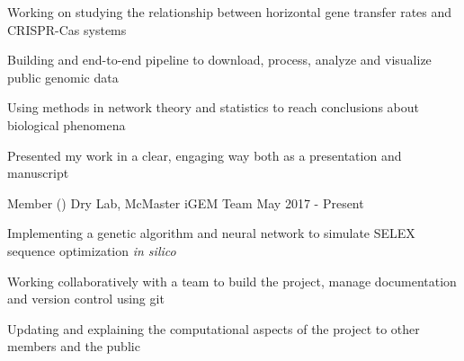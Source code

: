 \begin{cventries}
{\begin{cvitems}
         \item {Working on studying the relationship between horizontal gene transfer rates and CRISPR-Cas systems}
         \item {Building and end-to-end pipeline to download, process, analyze and visualize public genomic data}
         \item {Using methods in network theory and statistics to reach conclusions about biological phenomena}
         \item {Presented my work in a clear, engaging way both as a presentation and manuscript}
        \end{cvitems}
      }
	\cventry
      {Member ()}
      {Dry Lab, McMaster iGEM Team}
      {}
      {May 2017 - Present}
      {
        \begin{cvitems}
          \item{Implementing a genetic algorithm and neural network to simulate SELEX sequence optimization \textit{in silico}}
          \item{Working collaboratively with a team to build the project, manage documentation and version control using git}
          \item{Updating and explaining the computational aspects of the project to other members and the public}
        \end{cvitems}
      }
\end{cventries}
